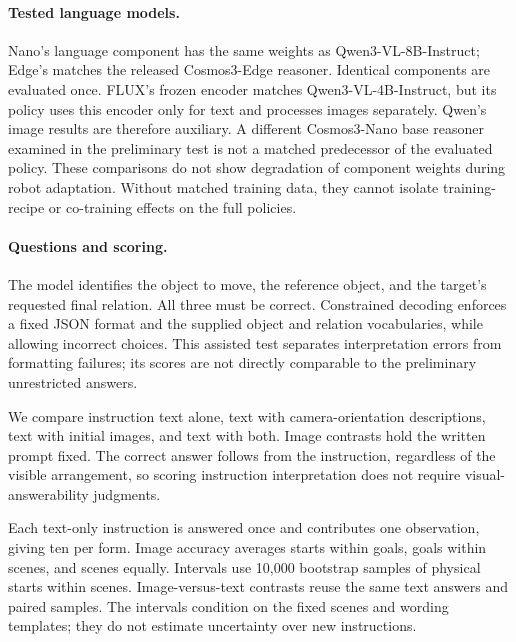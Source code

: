 \documentclass{article}
\begin{document}
\paragraph{Tested language models.}
Nano's language component has the same weights as Qwen3-VL-8B-Instruct; Edge's matches the released Cosmos3-Edge reasoner. Identical components are evaluated once. FLUX's frozen encoder matches Qwen3-VL-4B-Instruct, but its policy uses this encoder only for text and processes images separately. Qwen's image results are therefore auxiliary. A different Cosmos3-Nano base reasoner examined in the preliminary test is not a matched predecessor of the evaluated policy. These comparisons do not show degradation of component weights during robot adaptation. Without matched training data, they cannot isolate training-recipe or co-training effects on the full policies.

\paragraph{Questions and scoring.}
The model identifies the object to move, the reference object, and the target's requested final relation. All three must be correct. Constrained decoding enforces a fixed JSON format and the supplied object and relation vocabularies, while allowing incorrect choices. This assisted test separates interpretation errors from formatting failures; its scores are not directly comparable to the preliminary unrestricted answers.

We compare instruction text alone, text with camera-orientation descriptions, text with initial images, and text with both. Image contrasts hold the written prompt fixed. The correct answer follows from the instruction, regardless of the visible arrangement, so scoring instruction interpretation does not require visual-answerability judgments.

Each text-only instruction is answered once and contributes one observation, giving ten per form. Image accuracy averages starts within goals, goals within scenes, and scenes equally. Intervals use 10,000 bootstrap samples of physical starts within scenes. Image-versus-text contrasts reuse the same text answers and paired samples. The intervals condition on the fixed scenes and wording templates; they do not estimate uncertainty over new instructions.
\end{document}
